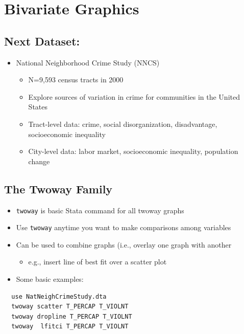 \documentclass[]{book}
\providecommand{\tightlist}{%
  \setlength{\itemsep}{0pt}\setlength{\parskip}{0pt}}
\begin{document}
\section{Bivariate Graphics}\label{bivariate-graphics}

\subsection{Next Dataset:}\label{next-dataset}

\begin{itemize}
\tightlist
\item
  National Neighborhood Crime Study (NNCS)

  \begin{itemize}
  \tightlist
  \item
    N=9,593 census tracts in 2000
  \item
    Explore sources of variation in crime for communities in the United
    States
  \item
    Tract-level data: crime, social disorganization, disadvantage,
    socioeconomic inequality
  \item
    City-level data: labor market, socioeconomic inequality, population
    change
  \end{itemize}
\end{itemize}

\subsection{The Twoway Family}\label{the-twoway-family}

\begin{itemize}
\tightlist
\item
  \texttt{twoway} is basic Stata command for all twoway graphs
\item
  Use \texttt{twoway} anytime you want to make comparisons among
  variables
\item
  Can be used to combine graphs (i.e., overlay one graph with another

  \begin{itemize}
  \tightlist
  \item
    e.g., insert line of best fit over a scatter plot
  \end{itemize}
\item
  Some basic examples:
\end{itemize}

\begin{verbatim}
  use NatNeighCrimeStudy.dta
  twoway scatter T_PERCAP T_VIOLNT
  twoway dropline T_PERCAP T_VIOLNT
  twoway  lfitci T_PERCAP T_VIOLNT
\end{verbatim}
\end{document}
